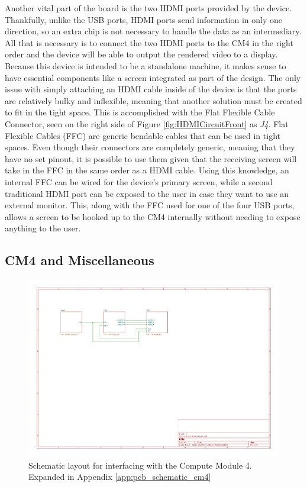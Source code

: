 Another vital part of the board is the two HDMI ports provided by the device.
Thankfully, unlike the USB ports, HDMI ports send information in only one direction, so an extra chip is not necessary to handle the data as an intermediary.
All that is necessary is to connect the two HDMI ports to the CM4 in the right order and the device will be able to output the rendered video to a display.
Because this device is intended to be a standalone machine, it makes sense to have essential components like a screen integrated as part of the design.
The only issue with simply attaching an HDMI cable inside of the device is that the ports are relatively bulky and inflexible, meaning that another solution must be created to fit in the tight space.
This is accomplished with the Flat Flexible Cable Connector, seen on the right side of Figure \ref{fig:HDMICircuitFront} as \emph{J4}.
Flat Flexible Cables (FFC) are generic bendable cables that can be used in tight spaces.
Even though their connectors are completely generic, meaning that they have no set pinout, it is possible to use them given that the receiving screen will take in the FFC in the same order as a HDMI cable.
Using this knowledge, an internal FFC can be wired for the device's primary screen, while a second traditional HDMI port can be exposed to the user in case they want to use an external monitor.
This, along with the FFC used for one of the four USB ports, allows a screen to be hooked up to the CM4 internally without needing to expose anything to the user.

\subsection{CM4 and Miscellaneous}\label{subsec:DesigningCM4}

\begin{figure}[t!]
  \centering
  \includegraphics[width=.75\textwidth,page=3]{Figures/kicad/lathrum_thesis_schematic.pdf}
  \caption[USB Schematic]{Schematic layout for interfacing with the Compute Module 4. Expanded in Appendix \ref{app:pcb_schematic_cm4}}
  \label{fig:pcb_schematic_cm4}
\end{figure}

